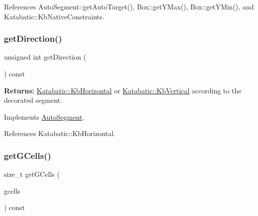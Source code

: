 References Auto\+Segment\+::get\+Auto\+Target(), Box\+::get\+Y\+Max(), Box\+::get\+Y\+Min(), and Katabatic\+::\+Kb\+Native\+Constraints.

\mbox{\label{classKatabatic_1_1AutoHorizontal_a0dd7cf705ace42c662c289955313b2e9}} 
\subsubsection{\texorpdfstring{get\+Direction()}{getDirection()}}
{\footnotesize\ttfamily unsigned int get\+Direction (\begin{DoxyParamCaption}{ }\end{DoxyParamCaption}) const\hspace{0.3cm}{\ttfamily [virtual]}}

{\bfseries Returns\+:} \hyperlink{namespaceKatabatic_a2af2ad6b6441614038caf59d04b3b217a1a9045673c5d3c30b067100f1440ae1b}{Katabatic\+::\+Kb\+Horizontal} or \hyperlink{namespaceKatabatic_a2af2ad6b6441614038caf59d04b3b217a284cad95203a27172838b09e396e3590}{Katabatic\+::\+Kb\+Vertical} according to the decorated segment. 

Implements \hyperlink{classKatabatic_1_1AutoSegment_ae35b78590ed6aa546b626ef95f28c533}{Auto\+Segment}.



References Katabatic\+::\+Kb\+Horizontal.

\mbox{\label{classKatabatic_1_1AutoHorizontal_accdaef4410043f64da247a94a309733e}} 
\subsubsection{\texorpdfstring{get\+G\+Cells()}{getGCells()}}
{\footnotesize\ttfamily size\+\_\+t get\+G\+Cells (\begin{DoxyParamCaption}\item[{vector$<$ \hyperlink{classKatabatic_1_1GCell}{G\+Cell} $\ast$$>$ \&}]{gcells }\end{DoxyParamCaption}) const\hspace{0.3cm}{\ttfamily [virtual]}}


